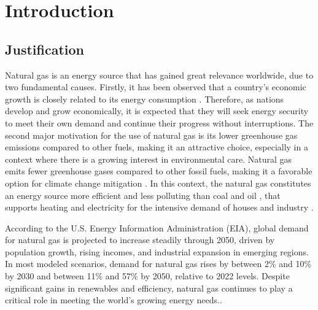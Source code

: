 \chapter{Introduction} \label{cap:introduccion}

\section{Justification}

Natural gas is an energy source that has gained great relevance worldwide, due to two fundamental causes. Firstly, it has been observed that a country's economic growth is closely related to its energy consumption \cite{Alam_M}. Therefore, as nations develop and grow economically, it is expected that they will seek energy security to meet their own demand and continue their progress without interruptions. The second major motivation for the use of natural gas is its lower greenhouse gas emissions compared to other fuels, making it an attractive choice, especially in a context where there is a growing interest in environmental care. Natural gas emits fewer greenhouse gases compared to other fossil fuels, making it a favorable option for climate change mitigation \cite{china_natural_gas}. In this context, the natural gas constitutes an energy source more efficient and less polluting than coal and oil \cite{Yin_Wen_Wu_Han_Mukhtar_Gong_2022}, that supports heating and electricity for the intensive demand of houses and industry \cite{Aydin_2018}.



According to the U.S. Energy Information Administration (EIA), global demand for natural gas is projected to increase steadily through 2050, driven by population growth, rising incomes, and industrial expansion in emerging regions. In most modeled scenarios, demand for natural gas rises by between 2\% and 10\% by 2030 and between 11\% and 57\% by 2050, relative to 2022 levels. Despite significant gains in renewables and efficiency, natural gas continues to play a critical role in meeting the world's growing energy needs.\cite{IEA_2024}. 


